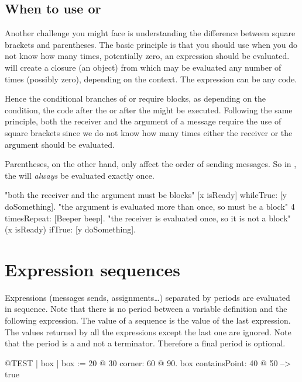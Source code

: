 \documentclass[a4paper,10pt,twoside]{book}
\begin{document}
\subsection{When to use \lct{[ ]} or \lct{( )}}
Another challenge you might face is understanding the difference between square brackets and parentheses.
The basic principle is that you should use \ct{[ ]} when you do not know how many times, potentially zero, an expression should be evaluated.
 will create a  closure (\ie an object) from  which may be evaluated any number of times (possibly zero), depending on the context.
The expression can be any code.

Hence the conditional branches of  or  require blocks, as depending on the condition, the code after the  or after the  might be executed.
Following the same principle, both the receiver and the argument of a  message require the use of square brackets since we do not know how many times either the receiver or the argument should be evaluated.

Parentheses, on the other hand, only affect the order of sending messages.
So in , the  will \emph{always} be evaluated exactly once.

\begin{code}{}
"both the receiver and the argument must be blocks"
[x isReady] whileTrue: [y doSomething].
"the argument is evaluated more than once, so must be a block"
4 timesRepeat: [Beeper beep].
"the receiver is evaluated once, so it is not a block"
(x isReady) ifTrue: [y doSomething].
\end{code}

\section{Expression sequences}
Expressions (\ie messages sends, assignments\dots) separated by periods are evaluated in sequence.
Note that there is no period between a variable definition and the following expression.
The value of a sequence is the value of the last expression.
The values returned by all the expressions except the last one are ignored.
Note that the period is a  and not a terminator.
Therefore a final period is optional.

\begin{code}{@TEST}
| box |
box := 20 @ 30 corner: 60 @ 90.
box containsPoint: 40 @ 50 --> true
\end{code}
\end{document}
